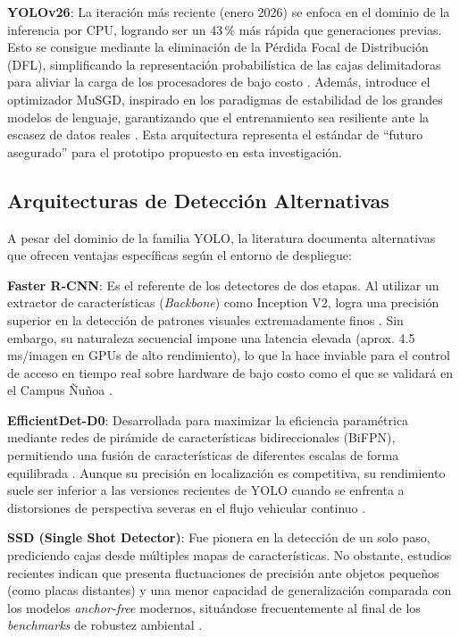 \textbf{YOLOv26}: La iteración más reciente (enero 2026) se enfoca en el dominio de la 
inferencia por CPU, logrando ser un 43\,\% más rápida que generaciones previas. Esto se 
consigue mediante la eliminación de la Pérdida Focal de Distribución (DFL), simplificando 
la representación probabilística de las cajas delimitadoras para aliviar la carga de los 
procesadores de bajo costo 
\parencite{YOLOv8VsYOLOv102025, YOLOv10VsYOLOv82025}. 
Además, introduce el optimizador MuSGD, inspirado en los paradigmas de estabilidad de los 
grandes modelos de lenguaje, garantizando que el entrenamiento sea resiliente ante la 
escasez de datos reales \parencite{YOLOv8VsYOLOv102025, YOLOv10VsYOLOv82025}. 
Esta arquitectura representa el estándar de ``futuro asegurado'' para el prototipo propuesto 
en esta investigación.

\subsection{Arquitecturas de Detección Alternativas}

A pesar del dominio de la familia YOLO, la literatura documenta alternativas que ofrecen 
ventajas específicas según el entorno de despliegue:

\textbf{Faster R-CNN}: Es el referente de los detectores de dos etapas. Al utilizar un 
extractor de características (\textit{Backbone}) como Inception V2, logra una precisión 
superior en la detección de patrones visuales extremadamente finos 
\parencite{kuyunsaDeepLearningEnhancedAutomatic2025}. 
Sin embargo, su naturaleza secuencial impone una latencia elevada (aprox. 4.5 ms/imagen 
en GPUs de alto rendimiento), lo que la hace inviable para el control de acceso en tiempo 
real sobre hardware de bajo costo como el que se validará en el Campus Ñuñoa 
\parencite{meesadAdvancedDeepLearning2025a, swatiEfficientDeepLearning2024}.

\textbf{EfficientDet-D0}: Desarrollada para maximizar la eficiencia paramétrica mediante 
redes de pirámide de características bidireccionales (BiFPN), permitiendo una fusión de 
características de diferentes escalas de forma equilibrada 
\parencite{swatiEfficientDeepLearning2024}. 
Aunque su precisión en localización es competitiva, su rendimiento suele ser inferior a 
las versiones recientes de YOLO cuando se enfrenta a distorsiones de perspectiva severas 
en el flujo vehicular continuo \parencite{swatiEfficientDeepLearning2024}.

\textbf{SSD (Single Shot Detector)}: Fue pionera en la detección de un solo paso, 
prediciendo cajas desde múltiples mapas de características. No obstante, estudios 
recientes indican que presenta fluctuaciones de precisión ante objetos pequeños (como 
placas distantes) y una menor capacidad de generalización comparada con los modelos 
\textit{anchor-free} modernos, situándose frecuentemente al final de los \textit{benchmarks} 
de robustez ambiental 
\parencite{meesadAdvancedDeepLearning2025a, swatiEfficientDeepLearning2024}.


